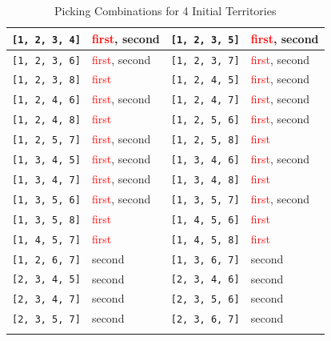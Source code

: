 \begin{longtable}{|p{2.5cm}|p{2.5cm}||p{2.5cm}|p{2.5cm}|}
\texttt{[1, 2, 3, 4]} & \textcolor{red}{first}, \textcolor{CustomBlue}{second} & \texttt{[1, 2, 3, 5]} & \textcolor{red}{first}, \textcolor{CustomBlue}{second} \\ \hline
\texttt{[1, 2, 3, 6]} & \textcolor{red}{first}, \textcolor{CustomBlue}{second} & \texttt{[1, 2, 3, 7]} & \textcolor{red}{first}, \textcolor{CustomBlue}{second} \\ \hline
\texttt{[1, 2, 3, 8]} & \textcolor{red}{first} & \texttt{[1, 2, 4, 5]} & \textcolor{red}{first}, \textcolor{CustomBlue}{second} \\ \hline
\texttt{[1, 2, 4, 6]} & \textcolor{red}{first}, \textcolor{CustomBlue}{second} & \texttt{[1, 2, 4, 7]} & \textcolor{red}{first}, \textcolor{CustomBlue}{second} \\ \hline
\texttt{[1, 2, 4, 8]} & \textcolor{red}{first} & \texttt{[1, 2, 5, 6]} & \textcolor{red}{first}, \textcolor{CustomBlue}{second} \\ \hline
\texttt{[1, 2, 5, 7]} & \textcolor{red}{first}, \textcolor{CustomBlue}{second} & \texttt{[1, 2, 5, 8]} & \textcolor{red}{first} \\ \hline
\texttt{[1, 3, 4, 5]} & \textcolor{red}{first}, \textcolor{CustomBlue}{second} & \texttt{[1, 3, 4, 6]} & \textcolor{red}{first}, \textcolor{CustomBlue}{second} \\ \hline
\texttt{[1, 3, 4, 7]} & \textcolor{red}{first}, \textcolor{CustomBlue}{second} & \texttt{[1, 3, 4, 8]} & \textcolor{red}{first} \\ \hline
\texttt{[1, 3, 5, 6]} & \textcolor{red}{first}, \textcolor{CustomBlue}{second} & \texttt{[1, 3, 5, 7]} & \textcolor{red}{first}, \textcolor{CustomBlue}{second} \\ \hline
\texttt{[1, 3, 5, 8]} & \textcolor{red}{first} & \texttt{[1, 4, 5, 6]} & \textcolor{red}{first} \\ \hline
\texttt{[1, 4, 5, 7]} & \textcolor{red}{first} & \texttt{[1, 4, 5, 8]} & \textcolor{red}{first} \\ \hline
\texttt{[1, 2, 6, 7]} & \textcolor{CustomBlue}{second} & \texttt{[1, 3, 6, 7]} & \textcolor{CustomBlue}{second} \\ \hline
\texttt{[2, 3, 4, 5]} & \textcolor{CustomBlue}{second} & \texttt{[2, 3, 4, 6]} & \textcolor{CustomBlue}{second} \\ \hline
\texttt{[2, 3, 4, 7]} & \textcolor{CustomBlue}{second} & \texttt{[2, 3, 5, 6]} & \textcolor{CustomBlue}{second} \\ \hline
\texttt{[2, 3, 5, 7]} & \textcolor{CustomBlue}{second} & \texttt{[2, 3, 6, 7]} & \textcolor{CustomBlue}{second} \\ \hline

\caption{Picking Combinations for 4 Initial Territories}
\label{tab:4territories}
\end{longtable}


